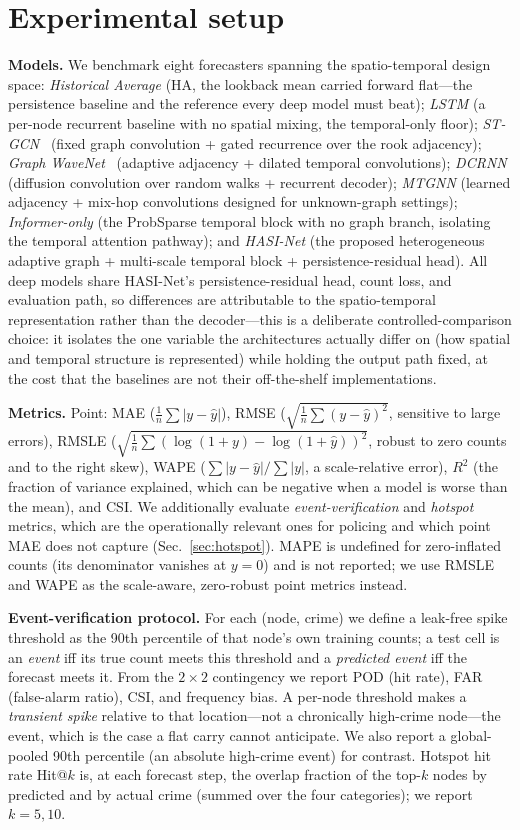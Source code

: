 \documentclass[11pt,conference]{IEEEtran}
\begin{document}
\section{Experimental setup}\label{sec:setup}
\textbf{Models.} We benchmark eight forecasters spanning the
spatio-temporal design space: \textit{Historical Average} (HA, the
lookback mean carried forward flat---the persistence baseline and the
reference every deep model must beat); \textit{LSTM} (a per-node recurrent
baseline with no spatial mixing, the temporal-only floor);
\textit{ST-GCN}~\cite{yu2018stgcn} (fixed graph convolution + gated
recurrence over the rook adjacency); \textit{Graph
WaveNet}~\cite{wu2019graphwavenet} (adaptive adjacency + dilated temporal
convolutions); \textit{DCRNN} (diffusion convolution over random walks +
recurrent decoder); \textit{MTGNN} (learned adjacency + mix-hop convolutions
designed for unknown-graph settings); \textit{Informer-only} (the ProbSparse
temporal block with no graph branch, isolating the temporal attention pathway);
and \textit{HASI-Net} (the proposed heterogeneous adaptive graph + multi-scale
temporal block + persistence-residual head). All deep models share
HASI-Net's persistence-residual head, count loss, and evaluation path, so
differences are attributable to the spatio-temporal representation rather than
the decoder---this is a deliberate controlled-comparison choice: it isolates
the one variable the architectures actually differ on (how spatial and
temporal structure is represented) while holding the output path fixed, at the
cost that the baselines are not their off-the-shelf implementations.

\textbf{Metrics.} Point: MAE ($\frac1n\sum|y-\hat y|$), RMSE
($\sqrt{\frac1n\sum(y-\hat y)^2}$, sensitive to large errors), RMSLE
($\sqrt{\frac1n\sum(\log(1{+}y)-\log(1{+}\hat y))^2}$, robust to zero counts
and to the right skew), WAPE ($\sum|y-\hat y|/\sum|y|$, a scale-relative error),
$R^2$ (the fraction of variance explained, which can be negative when a model
is worse than the mean), and CSI. We additionally evaluate
\emph{event-verification} and \emph{hotspot} metrics, which are the
operationally relevant ones for policing and which point MAE does not capture
(Sec.~\ref{sec:hotspot}). MAPE is undefined for zero-inflated counts (its
denominator vanishes at $y{=}0$) and is not reported; we use RMSLE and WAPE as
the scale-aware, zero-robust point metrics instead.

\textbf{Event-verification protocol.} For each (node, crime) we define a
leak-free spike threshold as the 90th percentile of that node's own training
counts; a test cell is an \emph{event} iff its true count meets this threshold
and a \emph{predicted event} iff the forecast meets it. From the $2{\times}2$
contingency we report POD (hit rate), FAR (false-alarm ratio), CSI, and
frequency bias. A per-node threshold makes a \emph{transient spike} relative
to that location---not a chronically high-crime node---the event, which is the
case a flat carry cannot anticipate. We also report a global-pooled 90th
percentile (an absolute high-crime event) for contrast. Hotspot hit rate
Hit@$k$ is, at each forecast step, the overlap fraction of the top-$k$ nodes
by predicted and by actual crime (summed over the four categories); we report
$k{=}5,10$.
\end{document}
